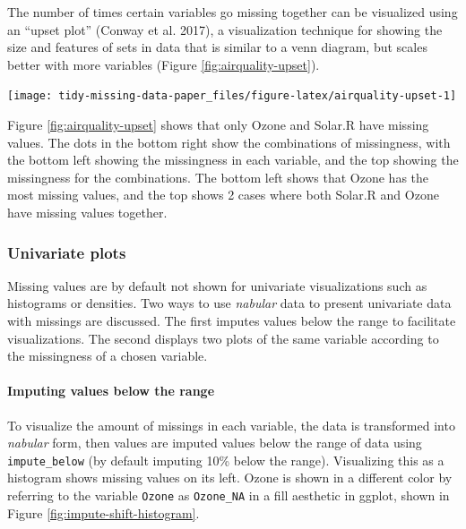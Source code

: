 \documentclass[]{article}
\let\oldparagraph\paragraph
\renewcommand{\paragraph}[1]{\oldparagraph{#1}\mbox{}}
\let\origfigure\figure
\let\endorigfigure\endfigure
\renewenvironment{figure}[1][2] {
    \expandafter\origfigure\expandafter[H]
} {
    \endorigfigure
}
\theoremstyle{definition}
\theoremstyle{definition}
\theoremstyle{definition}
\theoremstyle{remark}
\begin{document}
The number of times certain variables go missing together can be
visualized using an ``upset plot'' (Conway et al. 2017), a visualization
technique for showing the size and features of sets in data that is
similar to a venn diagram, but scales better with more variables (Figure
\ref{fig:airquality-upset}).

\begin{figure}

{\centering \texttt{[image: tidy-missing-data-paper\_files/figure-latex/airquality-upset-1]} 

}

\caption{The pattern of missingness in the airquality dataset shown in an upset plot. Only Ozone and Solar.R have missing values, and Ozone has the most missing values. There are 2 cases where both Solar.R and Ozone have missing values.}\label{fig:airquality-upset}
\end{figure}

Figure \ref{fig:airquality-upset} shows that only Ozone and Solar.R have
missing values. The dots in the bottom right show the combinations of
missingness, with the bottom left showing the missingness in each
variable, and the top showing the missingness for the combinations. The
bottom left shows that Ozone has the most missing values, and the top
shows 2 cases where both Solar.R and Ozone have missing values together.

\hypertarget{univariate-plots}{%
\subsubsection{Univariate plots}\label{univariate-plots}}

Missing values are by default not shown for univariate visualizations
such as histograms or densities. Two ways to use \emph{nabular} data to
present univariate data with missings are discussed. The first imputes
values below the range to facilitate visualizations. The second displays
two plots of the same variable according to the missingness of a chosen
variable.

\hypertarget{imp-below-range}{%
\paragraph{Imputing values below the range}\label{imp-below-range}}

To visualize the amount of missings in each variable, the data is
transformed into \emph{nabular} form, then values are imputed values
below the range of data using \texttt{impute\_below} (by default
imputing 10\% below the range). Visualizing this as a histogram shows
missing values on its left. Ozone is shown in a different color by
referring to the variable \texttt{Ozone} as \texttt{Ozone\_NA} in a fill
aesthetic in ggplot, shown in Figure \ref{fig:impute-shift-histogram}.
\end{document}
